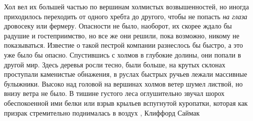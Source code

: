 Хол вел их большей частью по вершинам холмистых возвышенностей, но иногда
приходилось переходить от одного хребта до другого, чтобы не попасть \emph{на
глаза} дровосеку или фермеру. Опасности не было, наоборот, их скорее ждало бы
радушие и гостеприимство, но все же они решили, пока возможно, никому не
показываться.  Известие о такой пестрой компании разнеслось бы быстро, а это
уже было бы опасно.  Спустившись с холмов в глубокие долины, они попали в
другой мир. Здесь деревья росли тесно, были больше, на крутых склонах
проступали каменистые обнажения, в руслах быстрых ручьев лежали массивные
булыжники. Высоко над головой на вершинах холмов ветер шумел листвой, но внизу
ветра не было. В тишине густого леса оглушительно звучал шорох обеспокоенной
ими белки или взрыв крыльев вспугнутой куропатки, которая как призрак
стремительно поднималась в воздух
, Клиффорд Саймак
